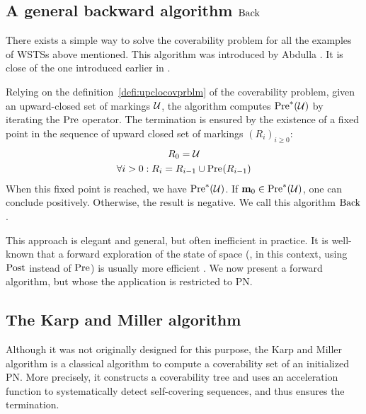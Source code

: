 \subsection{A general backward algorithm $\operatorname{Back}$}
\label{sec:backward-algorithm}

There exists a simple way to solve the coverability problem for all the examples of \acp{WSTS} above mentioned.
This algorithm was introduced by Abdulla  \citep{Abdulla96}.
It is close of the one introduced earlier in \cite{Finkel90}.

Relying on the definition~\ref{defi:upclocovprblm} of the coverability problem, given an upward-closed set of markings $\mathcal{U}$, the algorithm computes $\operatorname{Pre}^*_{}(\mathcal{U})$ by iterating the $\operatorname{Pre}$ operator.
The termination is ensured by the existence of a fixed point in the sequence of upward closed set of markings $(R_i)_{i \geq 0}$:
\begin{gather*}
  R_0 = \mathcal{U} \\
  \forall i > 0 : R_i = R_{i-1} \cup \operatorname{Pre}_{}(R_{i-1})
\end{gather*}
When this fixed point is reached, we have $\operatorname{Pre}^*_{}(\mathcal{U})$.
If $\mathbf{m}_0 \in \operatorname{Pre}^*_{}(\mathcal{U})$, one can conclude positively.
Otherwise, the result is negative.
We call this algorithm $\operatorname{Back}$.

This approach is elegant and general, but often inefficient in practice.
It is well-known that a forward exploration of the state of space (, in this context, using $\operatorname{Post}$ instead of $\operatorname{Pre}$) is usually more efficient \citep{Henzinger98}.
We now present a forward algorithm, but whose the application is restricted to \ac{PN}.

\subsection{The Karp and Miller algorithm}

Although it was not originally designed for this purpose, the Karp and Miller algorithm \cite{Karp69} is a classical algorithm to compute a coverability set of an initialized \ac{PN}.
More precisely, it constructs a coverability tree and uses an acceleration function to systematically detect self-covering sequences, and thus ensures the termination.

